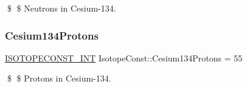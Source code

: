 \$ \$ Neutrons in Cesium-\/134. \mbox{\label{group___isotope_const-_cesium-_cs134_ga68cd92e999057d37fd5166431903fe27}} 
\subsubsection{\texorpdfstring{Cesium134\+Protons}{Cesium134Protons}}
{\footnotesize\ttfamily \mbox{\hyperlink{group___isotope_const-_macros_ga5f18360b3e99483a35c32d789e62621c}{I\+S\+O\+T\+O\+P\+E\+C\+O\+N\+S\+T\+\_\+\+I\+NT}} Isotope\+Const\+::\+Cesium134\+Protons = 55}

\$ \$ Protons in Cesium-\/134. 